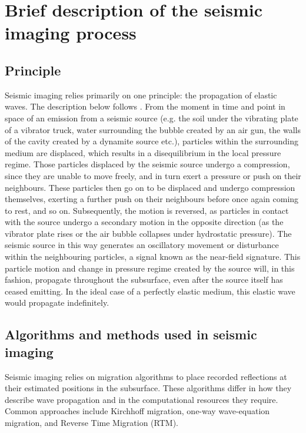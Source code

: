 \documentclass[letterpaper,11pt,leqno]{article}
\begin{document}
\section{Brief description of the seismic imaging process}\label{s:seismic imaging}



\subsection{Principle}
Seismic imaging relies primarily on one principle: the propagation of elastic waves. The description below follows \citet{Robein2003}.
From the moment in time and point in space of an emission from a seismic source (e.g. the soil under the vibrating plate of a vibrator truck, water surrounding the bubble created by an air gun, the walls of the cavity created by a dynamite source etc.), particles within the surrounding medium are displaced, which results in a disequilibrium in the local pressure regime. Those particles displaced by the seismic source undergo a compression, since they are unable to move freely, and in turn exert a pressure or push on their neighbours. These particles then go on to be displaced and undergo compression themselves, exerting a further push on their neighbours before once again coming to rest, and so on. Subsequently, the motion is reversed, as particles in contact with the source undergo a secondary motion in the opposite direction (as the vibrator plate rises or the air bubble collapses under hydrostatic pressure). The seismic source in this way generates an oscillatory movement or disturbance within the neighbouring particles, a signal known as the near-field signature. This particle motion and change in pressure regime created by the source will, in this fashion, propagate throughout the subsurface, even after the source itself has ceased emitting. In the ideal case of a perfectly elastic medium, this elastic wave would propagate indefinitely. 


\subsection{Algorithms and methods used in seismic imaging} 
Seismic imaging relies on migration algorithms to place recorded reflections at their estimated positions in the subsurface. These algorithms differ in how they describe wave propagation and in the computational resources they require. Common approaches include Kirchhoff migration, one-way wave-equation migration, and Reverse Time Migration (RTM).
\end{document}
